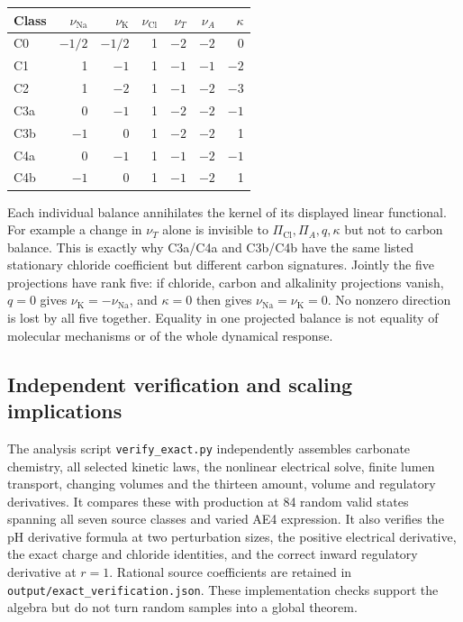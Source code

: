 \begin{center}
\begin{tabular}{lrrrrrr}
\hline
Class & $\nu_{\mathrm{Na}}$ & $\nu_{\mathrm K}$ & $\nu_{\mathrm{Cl}}$
      & $\nu_T$ & $\nu_A$ & $\kappa$\\
\hline
C0  & $-1/2$ & $-1/2$ & 1 & $-2$ & $-2$ & 0\\
C1  & 1 & $-1$ & 1 & $-1$ & $-1$ & $-2$\\
C2  & 1 & $-2$ & 1 & $-1$ & $-2$ & $-3$\\
C3a & 0 & $-1$ & 1 & $-2$ & $-2$ & $-1$\\
C3b & $-1$ & 0 & 1 & $-2$ & $-2$ & 1\\
C4a & 0 & $-1$ & 1 & $-1$ & $-2$ & $-1$\\
C4b & $-1$ & 0 & 1 & $-1$ & $-2$ & 1\\
\hline
\end{tabular}
\end{center}
Each individual balance annihilates the kernel of its displayed linear
functional.  For example a change in $\nu_T$ alone is invisible to
$\Pi_{\mathrm{Cl}},\Pi_A,q,\kappa$ but not to carbon balance.  This is
exactly why C3a/C4a and C3b/C4b have the same listed stationary chloride
coefficient but different carbon signatures.  Jointly the five projections
have rank five: if chloride, carbon and alkalinity projections vanish,
$q=0$ gives $\nu_{\mathrm K}=-\nu_{\mathrm{Na}}$, and $\kappa=0$
then gives $\nu_{\mathrm{Na}}=\nu_{\mathrm K}=0$.  No nonzero direction
is lost by all five together.  Equality in one projected balance is not
equality of molecular mechanisms or of the whole dynamical response.

\subsection{Independent verification and scaling implications}
The analysis script \texttt{verify\_exact.py} independently assembles
carbonate chemistry, all selected kinetic laws, the nonlinear electrical
solve, finite lumen transport, changing volumes and the thirteen amount,
volume and regulatory derivatives.  It compares these with production
at 84 random valid states spanning all seven source classes and varied
AE4 expression.  It also verifies the pH derivative formula at two
perturbation sizes, the positive electrical derivative, the exact charge
and chloride identities, and the correct inward regulatory derivative at
$r=1$.  Rational source coefficients are retained in
\texttt{output/exact\_verification.json}.  These implementation checks
support the algebra but do not turn random samples into a global theorem.

